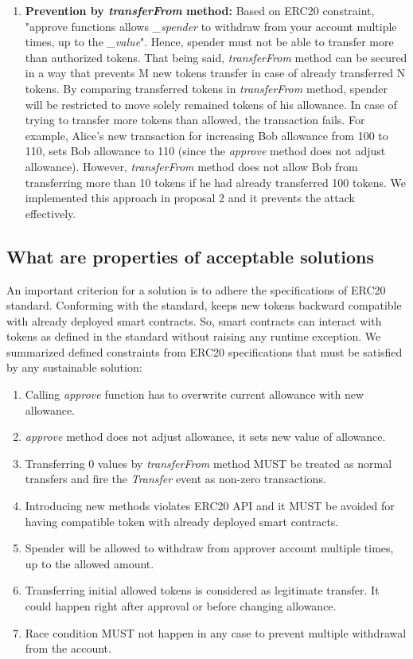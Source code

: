 \begin{enumerate}[label=\Roman*.]
	\item \textbf{Prevention by \textit{transferFrom} method:} Based on ERC20 constraint, "approve functions allows \textit{\_spender} to withdraw from your account multiple times, up to the \textit{\_value}". Hence, spender must not be able to transfer more than authorized tokens. That being said, \textit{transferFrom} method can be secured in a way that prevents M new tokens transfer in case of already transferred N tokens. By comparing transferred tokens in \textit{transferFrom} method, spender will be restricted to move solely remained tokens of his allowance. In case of trying to transfer more tokens than allowed, the transaction fails. For example, Alice's new transaction for increasing Bob allowance from 100 to 110, sets Bob allowance to 110 (since the \textit{approve} method does not adjust allowance). However, \textit{transferFrom} method does not allow Bob from transferring more than 10 tokens if he had already transferred 100 tokens. We implemented this approach in proposal 2 and it prevents the attack effectively.
\end{enumerate}

\subsection{What are properties of acceptable solutions}
An important criterion for a solution is to adhere the specifications of ERC20 standard. Conforming with the standard, keeps new tokens backward compatible with already deployed smart contracts. So, smart contracts can interact with tokens as defined in the standard without raising any runtime exception. We summarized defined constraints from ERC20 specifications \cite{Ref08} that must be satisfied by any sustainable solution:
\begin{enumerate}
	\item Calling \textit{approve} function has to overwrite current allowance with new allowance.
	\item \textit{approve} method does not adjust allowance, it sets new value of allowance.
	\item Transferring 0 values by \textit{transferFrom} method MUST be treated as normal transfers and fire the \textit{Transfer} event as non-zero transactions.
	\item Introducing new methods violates ERC20 API and it MUST be avoided for having compatible token with already deployed smart contracts.
	\item Spender will be allowed to withdraw from approver account multiple times, up to the allowed amount.
	\item Transferring initial allowed tokens is considered as legitimate transfer. It could happen right after approval or before changing allowance.
	\item Race condition MUST not happen in any case to prevent multiple withdrawal from the account.\newline
\end{enumerate}